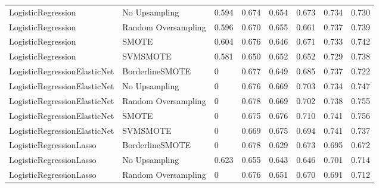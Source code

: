 \begin{tabular}{llllllll}
          LogisticRegression &       No Upsampling & 0.594 &                     0.674 &                 0.654 &                  0.673 &                                   0.734 &    0.730 \\
          LogisticRegression & Random Oversampling & 0.596 &                     0.670 &                 0.655 &                  0.661 &                                   0.737 &    0.739 \\
          LogisticRegression &               SMOTE & 0.604 &                     0.676 &                 0.646 &                  0.671 &                                   0.733 &    0.742 \\
          LogisticRegression &            SVMSMOTE & 0.581 &                     0.650 &                 0.652 &                  0.652 &                                   0.729 &    0.738 \\
LogisticRegressionElasticNet &     BorderlineSMOTE &     0 &                     0.677 &                 0.649 &                  0.685 &                                   0.737 &    0.722 \\
LogisticRegressionElasticNet &       No Upsampling &     0 &                     0.676 &                 0.669 &                  0.703 &                                   0.734 &    0.747 \\
LogisticRegressionElasticNet & Random Oversampling &     0 &                     0.678 &                 0.669 &                  0.702 &                                   0.738 &    0.755 \\
LogisticRegressionElasticNet &               SMOTE &     0 &                     0.675 &                 0.676 &                  0.710 &                                   0.741 &    0.756 \\
LogisticRegressionElasticNet &            SVMSMOTE &     0 &                     0.669 &                 0.675 &                  0.694 &                                   0.741 &    0.737 \\
     LogisticRegressionLasso &     BorderlineSMOTE &     0 &                     0.678 &                 0.629 &                  0.673 &                                   0.695 &    0.672 \\
     LogisticRegressionLasso &       No Upsampling & 0.623 &                     0.655 &                 0.643 &                  0.646 &                                   0.701 &    0.714 \\
     LogisticRegressionLasso & Random Oversampling &     0 &                     0.676 &                 0.651 &                  0.670 &                                   0.691 &    0.712 \\

\end{tabular}
